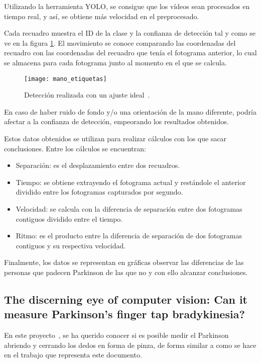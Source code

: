 Utilizando la herramienta YOLO, se consigue que los vídeos sean procesados en tiempo real, y así, se obtiene más velocidad en el preprocesado.

Cada recuadro muestra el ID de la clase y la confianza de detección tal y como se ve en la figura \ref{fig:manoetiquetas}. El movimiento se conoce comparando las coordenadas del recuadro con las coordenadas del recuadro que tenía el fotograma anterior, lo cual se almacena para cada fotograma junto al momento en el que se calcula.

\begin{figure}[]
	\texttt{[image: mano\_etiquetas]}
	\caption{Detección realizada con un ajuste ideal~\cite{jaber2021proposing}.}
	\label{fig:manoetiquetas}
\end{figure}

En caso de haber ruido de fondo y/o una orientación de la mano diferente, podría afectar a la confianza de detección, empeorando los resultados obtenidos.

Estos datos obtenidos se utilizan para realizar cálculos con los que sacar conclusiones. Entre los cálculos se encuentran:

\begin{itemize}
	\item Separación: es el desplazamiento entre dos recuadros.
	\item Tiempo: se obtiene extrayendo el fotograma actual y restándole el anterior dividido entre los fotogramas capturados por segundo.
	\item Velocidad: se calcula con la diferencia de separación entre dos fotogramas contiguos dividido entre el tiempo.
	\item Ritmo: es el producto entre la diferencia de separación de dos fotogramas contiguos y su respectiva velocidad.
\end{itemize}

Finalmente, los datos se representan en gráficas observar las diferencias de las personas que padecen Parkinson de las que no y con ello alcanzar conclusiones.

\subsection{The discerning eye of computer vision: Can it measure Parkinson's finger tap bradykinesia?}
En este proyecto~\cite{williams2020discerning}, se ha querido conocer si es posible medir el Parkinson abriendo y cerrando los dedos en forma de pinza, de forma similar a como se hace en el trabajo que representa este documento.

